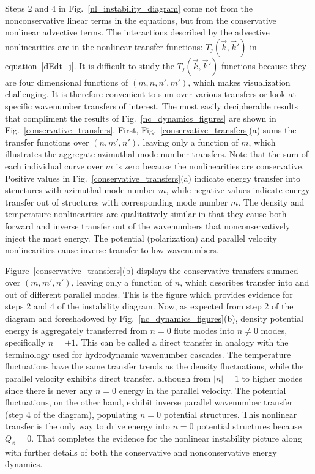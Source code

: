 \documentclass[showpacs,preprintnumbers,amsmath,amssymb,superscriptaddress,aip]{revtex4-1}
\begin{document}
Steps 2 and 4 in Fig.~\ref{nl_instability_diagram} come not from the nonconservative linear terms in the equations, but from the conservative nonlinear advective terms.
The interactions described by the advective nonlinearities are in the nonlinear transfer functions: $T_{j}(\vec{k},\vec{k}')$ in equation~\ref{dEdt_j}.
It is difficult to study the $T_{j}(\vec{k},\vec{k}')$ functions because they are four dimensional functions of $(m,n,n',m')$, 
which makes visualization challenging. It is therefore convenient to sum over various transfers or look at specific wavenumber transfers of interest. The most easily decipherable
results that compliment the results of Fig.~\ref{nc_dynamics_figures} are shown in Fig.~\ref{conservative_transfers}. First, Fig.~\ref{conservative_transfers}(a) sums the transfer functions over
$(n,m',n')$, leaving only a function of $m$, which illustrates the aggregate azimuthal mode
number transfers. Note that the sum of each individual curve over $m$ is zero because the nonlinearities are conservative. Positive values in Fig.~\ref{conservative_transfers}(a)
indicate energy transfer into structures with azimuthal mode number $m$, while negative values indicate energy transfer out of structures with corresponding mode number $m$. 
The density and temperature nonlinearities
are qualitatively similar in that they cause both forward and inverse transfer out of the wavenumbers that nonconservatively inject the most energy. The potential (polarization) and parallel velocity 
nonlinearities cause inverse transfer to low wavenumbers. 

Figure~\ref{conservative_transfers}(b) displays the conservative transfers summed over $(m,m',n')$, leaving only a function of $n$, which describes transfer into and out
of different parallel modes. This is the figure which provides evidence for steps 2 and 4 of the instability diagram.
Now, as expected from step 2 of the diagram and foreshadowed by Fig.~\ref{nc_dynamics_figures}(b), 
density potential energy is aggregately transferred from $n=0$ flute modes into $n \ne 0$ modes, specifically $n = \pm 1$. This can be called a direct
transfer in analogy with the terminology used for hydrodynamic wavenumber cascades. The temperature fluctuations have the same transfer trends 
as the density fluctuations, while the parallel velocity exhibits direct transfer, although from $|n|=1$ to higher modes since there is never any $n=0$ energy in the parallel velocity.
The potential fluctuations, on the other hand, exhibit inverse parallel wavenumber transfer (step 4 of the diagram),
populating $n=0$ potential structures. This nonlinear transfer is the only way to drive energy into
$n=0$ potential structures because $Q_\phi=0$. That completes the evidence for the nonlinear instability picture along with further details of both the conservative and nonconservative energy dynamics.
\end{document}
